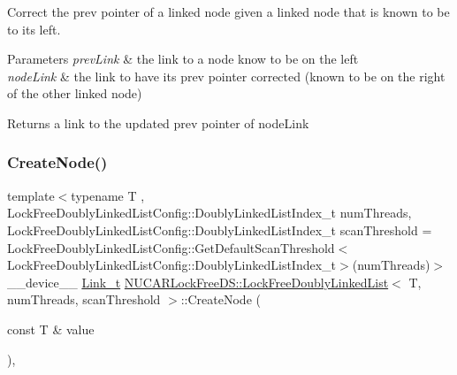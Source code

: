 Correct the prev pointer of a linked node given a linked node that is known to be to its left. 
\begin{DoxyParams}{Parameters}
{\em prev\+Link} & the link to a node know to be on the left \\
\hline
{\em node\+Link} & the link to have its prev pointer corrected (known to be on the right of the other linked node) \\
\hline
\end{DoxyParams}
\begin{DoxyReturn}{Returns}
a link to the updated prev pointer of node\+Link 
\end{DoxyReturn}
\mbox{\label{class_n_u_c_a_r_lock_free_d_s_1_1_lock_free_doubly_linked_list_a434fe84d6ee18bd68ff43b1448c17dbd}} 
\subsubsection{\texorpdfstring{Create\+Node()}{CreateNode()}}
{\footnotesize\ttfamily template$<$typename T , Lock\+Free\+Doubly\+Linked\+List\+Config\+::\+Doubly\+Linked\+List\+Index\+\_\+t num\+Threads, Lock\+Free\+Doubly\+Linked\+List\+Config\+::\+Doubly\+Linked\+List\+Index\+\_\+t scan\+Threshold = Lock\+Free\+Doubly\+Linked\+List\+Config\+::\+Get\+Default\+Scan\+Threshold$<$\+Lock\+Free\+Doubly\+Linked\+List\+Config\+::\+Doubly\+Linked\+List\+Index\+\_\+t$>$(num\+Threads)$>$ \\
\+\_\+\+\_\+device\+\_\+\+\_\+ \mbox{\hyperlink{class_n_u_c_a_r_lock_free_d_s_1_1_lock_free_doubly_linked_list_a08f21d5e04bc2a02d6c1d8861a6ba0de}{Link\+\_\+t}} \mbox{\hyperlink{class_n_u_c_a_r_lock_free_d_s_1_1_lock_free_doubly_linked_list}{N\+U\+C\+A\+R\+Lock\+Free\+D\+S\+::\+Lock\+Free\+Doubly\+Linked\+List}}$<$ T, num\+Threads, scan\+Threshold $>$\+::Create\+Node (\begin{DoxyParamCaption}\item[{const T \&}]{value }\end{DoxyParamCaption})\hspace{0.3cm}{\ttfamily [inline]}, {\ttfamily [private]}}

